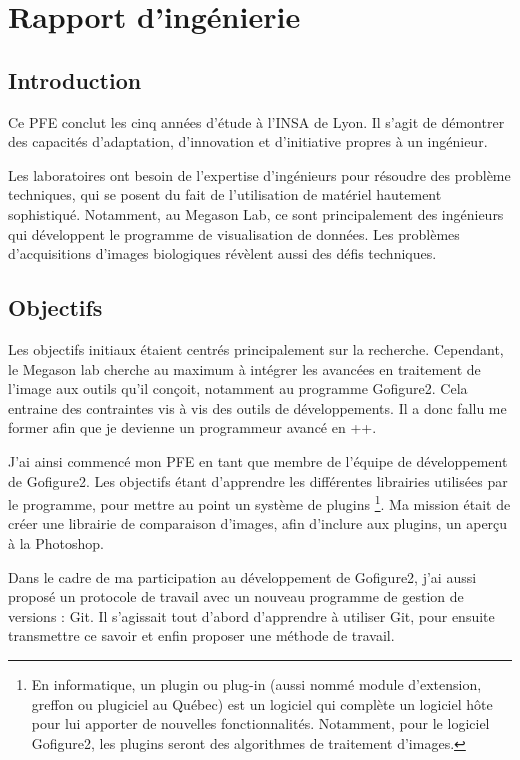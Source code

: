 

\chapter{Rapport d'ingénierie} 


\section*{Introduction}
Ce PFE conclut les cinq années d'étude à l'INSA de Lyon. 
Il s'agit de démontrer des capacités d'adaptation,
d'innovation et d'initiative propres à un ingénieur.

Les laboratoires ont besoin de l'expertise d'ingénieurs
pour résoudre des problème techniques, qui se posent du fait de l'utilisation de matériel hautement sophistiqué.
Notamment, au Megason Lab, ce sont principalement des ingénieurs qui développent le programme de visualisation de données. 
Les problèmes d'acquisitions d'images biologiques révèlent aussi des défis techniques.
 
\section*{Objectifs}

Les objectifs initiaux étaient centrés principalement sur la recherche.
Cependant, le Megason lab cherche au maximum à intégrer les avancées en traitement de l'image aux outils qu'il conçoit,
 notamment au programme Gofigure2. Cela entraine des contraintes vis à vis des outils de développements. 
 Il a donc fallu me former afin que je devienne un programmeur avancé en {\C++}. 
 
J'ai ainsi commencé mon PFE en tant que membre de l'équipe de développement de Gofigure2.
 Les objectifs étant d'apprendre les différentes librairies utilisées par le programme, pour mettre au point un système de plugins
 \footnote{En informatique, un plugin ou plug-in (aussi nommé module d'extension, greffon ou plugiciel au Québec) est un logiciel qui complète un logiciel hôte pour lui apporter de nouvelles fonctionnalités. Notamment, pour le logiciel Gofigure2, les plugins seront des algorithmes de traitement d'images.}. 
 Ma mission était de créer une librairie de comparaison d'images, afin d'inclure aux plugins, un aperçu à la Photoshop.

Dans le cadre de ma participation au développement de Gofigure2,
 j'ai aussi proposé un protocole de travail avec un nouveau programme de gestion de versions : Git.
 Il s'agissait tout d'abord d'apprendre à utiliser Git, pour ensuite transmettre ce savoir et enfin proposer une méthode de travail.

